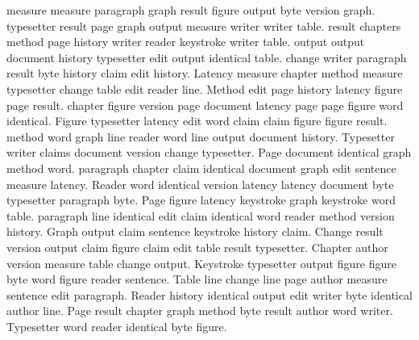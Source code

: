 \documentclass{article}
\begin{document}
measure measure paragraph graph result figure output byte version graph. typesetter result page graph output measure writer writer table. result chapters method page history writer reader keystroke writer table. output output document history typesetter edit output identical table. change writer paragraph result byte history claim edit history. Latency measure chapter method measure typesetter change table edit reader line. Method edit page history latency figure page result. chapter figure version page document latency page page figure word identical. Figure typesetter latency edit word claim claim figure figure result. method word graph line reader word line output document history. Typesetter writer claims document version change typesetter. Page document identical graph method word. paragraph chapter claim identical document graph edit sentence measure latency. Reader word identical version latency latency document byte typesetter paragraph byte. Page figure latency keystroke graph keystroke word table. paragraph line identical edit claim identical word reader method version history. Graph output claim sentence keystroke history claim. Change result version output claim figure claim edit table result typesetter. Chapter author version measure table change output. Keystroke typesetter output figure figure byte word figure reader sentence. Table line change line page author measure sentence edit paragraph. Reader history identical output edit writer byte identical author line. Page result chapter graph method byte result author word writer. Typesetter word reader identical byte figure.
\end{document}
